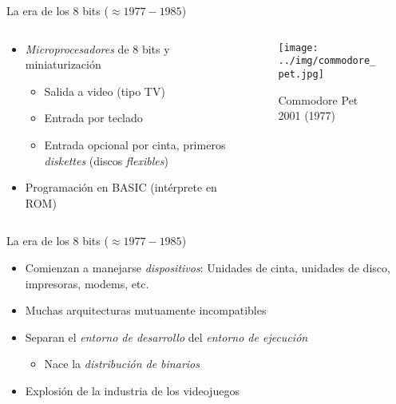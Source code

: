 \documentclass[presentation]{beamer}
\begin{document}
\begin{frame}[label={sec:org512f023}]{La era de los 8 bits (\(\approx 1977 - 1985\))}
\begin{columns}\begin{column}{0.6\textwidth}
\begin{itemize}
\item \emph{Microprocesadores} de 8 bits y miniaturización
\begin{itemize}
\item Salida a video (tipo TV)
\item Entrada por teclado
\item Entrada opcional por cinta, primeros \emph{diskettes} (discos
\emph{flexibles})
\end{itemize}
\item Programación en BASIC (intérprete en ROM)
\end{itemize}
\end{column} \begin{column}{0.4\textwidth}
\begin{figure}[htbp]
\centering
\texttt{[image: ../img/commodore\_pet.jpg]}
\caption{Commodore Pet 2001 (1977)}
\end{figure}
\end{column}\end{columns}
\end{frame}

\begin{frame}[label={sec:org5295519}]{La era de los 8 bits (\(\approx 1977 - 1985\))}
\begin{itemize}
\item Comienzan a manejarse \emph{dispositivos}: Unidades de cinta, unidades de
disco, impresoras, modems, etc.
\item Muchas arquitecturas mutuamente incompatibles
\item Separan el \emph{entorno de desarrollo} del \emph{entorno de ejecución}
\begin{itemize}
\item Nace la \emph{distribución de binarios}
\end{itemize}
\item Explosión de la industria de los videojuegos
\end{itemize}
\end{frame}
\end{document}
